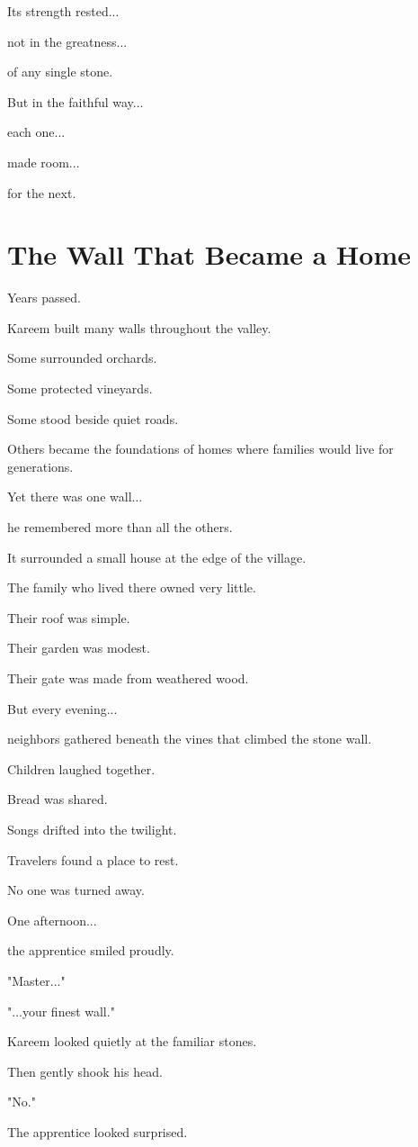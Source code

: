 \documentclass[12pt,openany]{book}
\begin{document}
Its strength rested...

not in the greatness...

of any single stone.

But in the faithful way...

each one...

made room...

for the next.
\section*{The Wall That Became a Home}

Years passed.

Kareem built many walls throughout the valley.

Some surrounded orchards.

Some protected vineyards.

Some stood beside quiet roads.

Others became the foundations of homes where families would live for generations.

Yet there was one wall...

he remembered more than all the others.

It surrounded a small house at the edge of the village.

The family who lived there owned very little.

Their roof was simple.

Their garden was modest.

Their gate was made from weathered wood.

But every evening...

neighbors gathered beneath the vines that climbed the stone wall.

Children laughed together.

Bread was shared.

Songs drifted into the twilight.

Travelers found a place to rest.

No one was turned away.

One afternoon...

the apprentice smiled proudly.

"Master..."

"...your finest wall."

Kareem looked quietly at the familiar stones.

Then gently shook his head.

"No."

The apprentice looked surprised.
\end{document}
